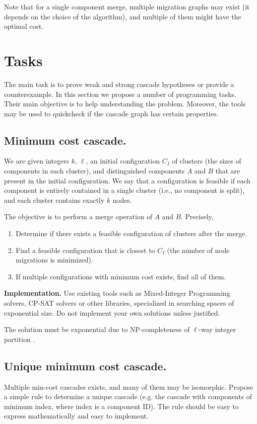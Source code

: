 \documentclass[a4paper,anonymous,USenglish]{lipics-v2019}
\begin{document}
Note that for a single component merge, multiple migration graphs may exist (it
depends on the choice of the algorithm), and multiple of them might have the optimal cost.


\section{Tasks}

The main task is to prove weak and strong cascade hypotheses or provide a
counterexample.
In this section we propose a number of programming tasks. Their main objective
is to help understanding the problem. Moreover, the tools may be used to quickcheck 
if the cascade graph has certain properties.


\subsection{Minimum cost cascade.}

We are given integers $k$, $\ell$, an initial configuration $C_I$ of clusters (the
sizes of components in each cluster), and distinguished components $A$ and
$B$ that are present in the initial configuration.
We say that a configuration is feasible if each component is entirely contained
in a single cluster (i.e., no component is split), and each cluster contains
exactly $k$ nodes.

The objective is to perform a merge operation of $A$ and $B$. Precisely,
\begin{enumerate}
    \item Determine if there exists a feasible configuration of clusters after
        the merge.
    \item Find a feasible configuration that is closest to $C_I$ (the number of
        node migrations is minimized).
    \item If multiple configurations with minimum cost exists, find all of them.
\end{enumerate}

\noindent
\textbf{Implementation.}
Use existing tools such as Mixed-Integer Programming solvers, CP-SAT solvers or
other libraries, specialized in searching spaces of exponential size.
Do not implement your own solutions unless justified.

\noindent The solution must be exponential due to NP-completeness of $\ell$-way integer
partition \cite{AndRae06}.
\subsection{Unique minimum cost cascade.}
Multiple min-cost cascades exists, and many of them may be isomorphic. Propose a
simple rule to determine a unique cascade (e.g. the cascade with components of
minimum index, where index is a component ID). The rule should be easy to
express mathematically and easy to implement.
\end{document}
